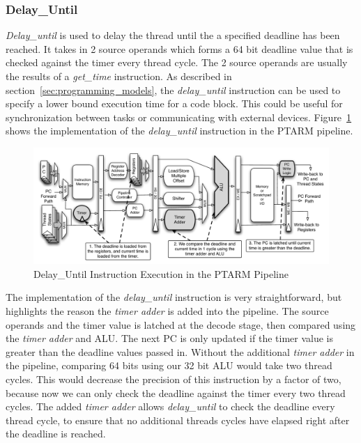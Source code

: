 
\subsubsection{Delay\_Until}    
\emph{Delay\_until} is used to delay the thread until the a specified deadline has been reached.
It takes in 2 source operands which forms a 64 bit deadline value that is checked against the timer every thread cycle.
The 2 source operands are usually the results of a \emph{get\_time} instruction.  
As described in section~\ref{sec:programming_models}, the \emph{delay\_until} instruction can be used to specify a lower bound execution time for a code block.
This could be useful for synchronization between tasks or communicating with external devices.
Figure~\ref{fig:delay_until_pipeline_implementation} shows the implementation of the \emph{delay\_until} instruction in the PTARM pipeline.       
\begin{figure}[h]
  \vspace{-15pt}
  \begin{center}
    \includegraphics[scale=.54]{figs/delay_until_pipeline_implementation}
  \end{center}
  \vspace{-3mm}
  \caption{Delay\_Until Instruction Execution in the PTARM Pipeline}
  \label{fig:delay_until_pipeline_implementation}
\end{figure}

The implementation of the \emph{delay\_until} instruction is very straightforward, but highlights the reason the \emph{timer adder} is added into the pipeline.
The source operands and the timer value is latched at the decode stage, then compared using the \emph{timer adder} and ALU. 
The next PC is only updated if the timer value is greater than the deadline values passed in.  
Without the additional \emph{timer adder} in the pipeline, comparing 64 bits using our 32 bit ALU would take two thread cycles. 
This would decrease the precision of this instruction by a factor of two, because now we can only check the deadline against the timer every two thread cycles.
The added \emph{timer adder} allows \emph{delay\_until} to check the deadline every thread cycle, to ensure that no additional threads cycles have elapsed right after the deadline is reached. 

